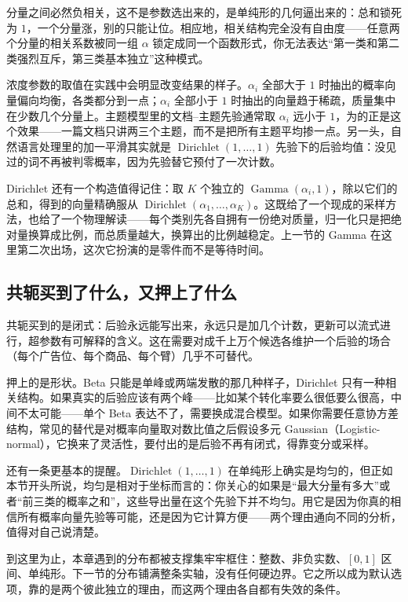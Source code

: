 分量之间必然负相关，这不是参数选出来的，是单纯形的几何逼出来的：总和锁死为 \(1\)，一个分量涨，别的只能让位。相应地，相关结构完全没有自由度——任意两个分量的相关系数被同一组 \(\alpha\) 锁定成同一个函数形式，你无法表达``第一类和第二类强烈互斥，第三类基本独立''这种模式。

浓度参数的取值在实践中会明显改变结果的样子。\(\alpha_i\) 全部大于 \(1\) 时抽出的概率向量偏向均衡，各类都分到一点；\(\alpha_i\) 全部小于 \(1\) 时抽出的向量趋于稀疏，质量集中在少数几个分量上。主题模型里的文档--主题先验通常取 \(\alpha_i\) 远小于 \(1\)，为的正是这个效果——一篇文档只讲两三个主题，而不是把所有主题平均掺一点。另一头，自然语言处理里的加一平滑其实就是 \(\operatorname{Dirichlet}(1,\ldots,1)\) 先验下的后验均值：没见过的词不再被判零概率，因为先验替它预付了一次计数。

Dirichlet 还有一个构造值得记住：取 \(K\) 个独立的 \(\operatorname{Gamma}(\alpha_i,1)\)，除以它们的总和，得到的向量精确服从 \(\operatorname{Dirichlet}(\alpha_1,\ldots,\alpha_K)\)。这既给了一个现成的采样方法，也给了一个物理解读——每个类别先各自拥有一份绝对质量，归一化只是把绝对量换算成比例，而总质量越大，换算出的比例越稳定。上一节的 Gamma 在这里第二次出场，这次它扮演的是零件而不是等待时间。

\subsection{共轭买到了什么，又押上了什么}

共轭买到的是闭式：后验永远能写出来，永远只是加几个计数，更新可以流式进行，超参数有可解释的含义。这在需要对成千上万个候选各维护一个后验的场合（每个广告位、每个商品、每个臂）几乎不可替代。

押上的是形状。Beta 只能是单峰或两端发散的那几种样子，Dirichlet 只有一种相关结构。如果真实的后验应该有两个峰——比如某个转化率要么很低要么很高，中间不太可能——单个 Beta 表达不了，需要换成混合模型。如果你需要任意协方差结构，常见的替代是对概率向量取对数比值之后假设多元 Gaussian（Logistic-normal），它换来了灵活性，要付出的是后验不再有闭式，得靠变分或采样。

还有一条更基本的提醒。\(\operatorname{Dirichlet}(1,\ldots,1)\) 在单纯形上确实是均匀的，但正如本节开头所说，均匀是相对于坐标而言的：你关心的如果是``最大分量有多大''或者``前三类的概率之和''，这些导出量在这个先验下并不均匀。用它是因为你真的相信所有概率向量先验等可能，还是因为它计算方便——两个理由通向不同的分析，值得对自己说清楚。

到这里为止，本章遇到的分布都被支撑集牢牢框住：整数、非负实数、\([0,1]\) 区间、单纯形。下一节的分布铺满整条实轴，没有任何硬边界。它之所以成为默认选项，靠的是两个彼此独立的理由，而这两个理由各自都有失效的条件。
